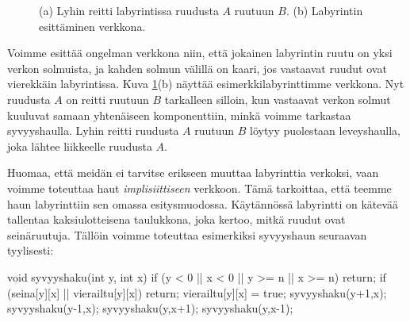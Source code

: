 \begin{figure}
\center
\begin{center}
\end{center}
\caption{(a) Lyhin reitti labyrintissa ruudusta $A$ ruutuun $B$. (b)
Labyrintin esittäminen verkkona.}
\label{fig:labrei}
\end{figure}

Voimme esittää ongelman verkkona niin,
että jokainen labyrintin ruutu on yksi verkon solmuista,
ja kahden solmun välillä on kaari,
jos vastaavat ruudut ovat vierekkäin labyrintissa.
Kuva \ref{fig:labrei}(b) näyttää esimerkkilabyrinttimme verkkona.
Nyt ruudusta $A$ on reitti ruutuun $B$ tarkalleen silloin,
kun vastaavat verkon solmut kuuluvat samaan yhtenäiseen komponenttiin,
minkä voimme tarkastaa syvyyshaulla.
Lyhin reitti ruudusta $A$ ruutuun $B$ löytyy puolestaan leveyshaulla,
joka lähtee liikkeelle ruudusta $A$.

Huomaa, että meidän ei tarvitse erikseen muuttaa labyrinttia
verkoksi, vaan voimme toteuttaa haut \emph{implisiittiseen} verkkoon.
Tämä tarkoittaa, että teemme haun labyrinttiin sen omassa
esitysmuodossa. Käytännössä labyrintti on kätevää tallentaa kaksiulotteisena
taulukkona, joka kertoo, mitkä ruudut ovat seinäruutuja.
Tällöin voimme toteuttaa esimerkiksi syvyyshaun seuraavan tyylisesti:

\begin{code}
void syvyyshaku(int y, int x) {
    if (y < 0 || x < 0 || y >= n || x >= n) return;
    if (seina[y][x] || vierailtu[y][x]) return;
    vierailtu[y][x] = true;
    syvyyshaku(y+1,x);
    syvyyshaku(y-1,x);
    syvyyshaku(y,x+1);
    syvyyshaku(y,x-1);
}
\end{code}